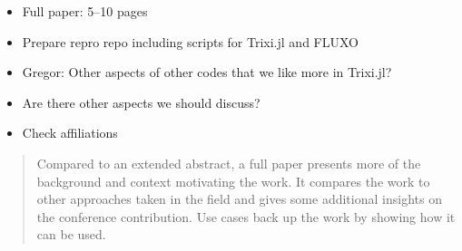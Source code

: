 \documentclass{juliacon}
\newcommand{\trixi}{Trixi.jl\xspace}
\newcommand{\todo}[1]{{\color{red}#1}}
\begin{document}



\todo{ %
\begin{itemize}
  \item Full paper: 5--10 pages
  \item Prepare repro repo including scripts for \trixi and FLUXO
  \item Gregor: Other aspects of other codes that we like more in \trixi?
  \item Are there other aspects we should discuss?
  \item Check affiliations
\end{itemize}
\begin{quote}
  Compared to an extended abstract, a full paper presents more of the background
  and context motivating the work. It compares the work to other approaches taken
  in the field and gives some additional insights on the conference contribution.
  Use cases back up the work by showing how it can be used.
\end{quote}}
\end{document}

